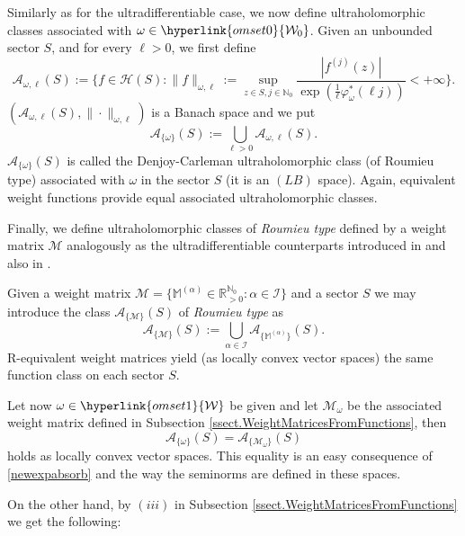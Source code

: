 \documentclass[11pt,a4paper]{article}
\theoremstyle{plain}
\theoremstyle{definition}
\newcommand{\RR}{\mathbb{R}}
\newcommand{\NN}{\mathbb{N}}
\newcommand{\M}{\mathbb{M}}
\begin{document}
Similarly as for the ultradifferentiable case, we now define ultraholomorphic classes associated with $\omega\in\hyperlink{omset0}{\mathcal{W}_0}$. Given an unbounded sector $S$, and for every $\ell>0$, we first define
\[\mathcal{A}_{\omega,\ell}(S):=\{f\in\mathcal{H}(S): \|f\|_{\omega,\ell}:=\sup_{z\in S, j\in\NN_0}\frac{|f^{(j)}(z)|}{\exp(\frac{1}{\ell}\varphi^{*}_{\omega}(\ell j))}<+\infty\}.\]
$(\mathcal{A}_{\omega,\ell}(S),\|\cdot\|_{\omega,\ell})$ is a Banach space and we put
\begin{equation*}%
	 \mathcal{A}_{\{\omega\}}(S):=\bigcup_{\ell>0}\mathcal{A}_{\omega,\ell}(S).
\end{equation*}
$\mathcal{A}_{\{\omega\}}(S)$ is called the Denjoy-Carleman ultraholomorphic class (of Roumieu type) associated with $\omega$ in the sector $S$ (it is an $(LB)$ space). Again, equivalent weight functions provide equal associated ultraholomorphic classes.

Finally, we define ultraholomorphic classes of {\itshape Roumieu type} defined by a weight matrix $\mathcal{M}$ analogously as the ultradifferentiable counterparts introduced in \cite[Section 7]{dissertation} and also in \cite[Section 4.2]{compositionpaper}.

Given a weight matrix $\mathcal{M}=\{\M^{(\alpha)}\in\RR_{>0}^{\NN_0}: \alpha\in\mathcal{I}\}$ and a sector $S$ we may introduce the class $\mathcal{A}_{\{\mathcal{M}\}}(S)$  of {\itshape Roumieu type} as
\begin{equation*}%
	 \mathcal{A}_{\{\mathcal{M}\}}(S):=\bigcup_{\alpha\in\mathcal{I}}\mathcal{A}_{\{\M^{(\alpha)}\}}(S).
\end{equation*}
R-equivalent weight matrices yield (as locally convex vector spaces) the same function class on each sector $S$.

Let now $\omega\in\hyperlink{omset1}{\mathcal{W}}$ be given and let $\mathcal{M}_{\omega}$ be the associated weight matrix defined in Subsection \ref{ssect.WeightMatricesFromFunctions}, then
\begin{equation}\label{equaEqualitySpacesWeightFunctionMatrix}
	 \mathcal{A}_{\{\omega\}}(S)=\mathcal{A}_{\{\mathcal{M}_{\omega}\}}(S)
\end{equation}
holds as locally convex vector spaces. This equality is an easy consequence of \eqref{newexpabsorb} and the way the seminorms are defined in these spaces.\vspace{6pt}

On the other hand, by $(iii)$ in Subsection \ref{ssect.WeightMatricesFromFunctions} we get the following:
\end{document}
